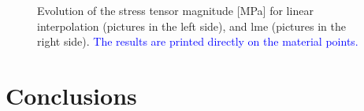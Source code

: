 \documentclass[preprint,12pt,a4paper]{elsarticle}
\begin{document}
\begin{figure}
\centering
{}
\caption{Evolution of the stress tensor magnitude [MPa] for linear
  interpolation (pictures in the left side), and \acrshort{lme}
  (pictures in the right side). \textcolor{blue}{The results are printed directly on the material points.}}
\label{fig:Stress-vs-damage-impact-test}
\end{figure}

\section{Conclusions}
\label{sec:4}
\end{document}
